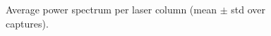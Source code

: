 \begin{figure}[t]
\centering

\caption{Average power spectrum per laser column (mean $\pm$ std over captures).}
\label{fig:power_by_laser_col}
\end{figure}
